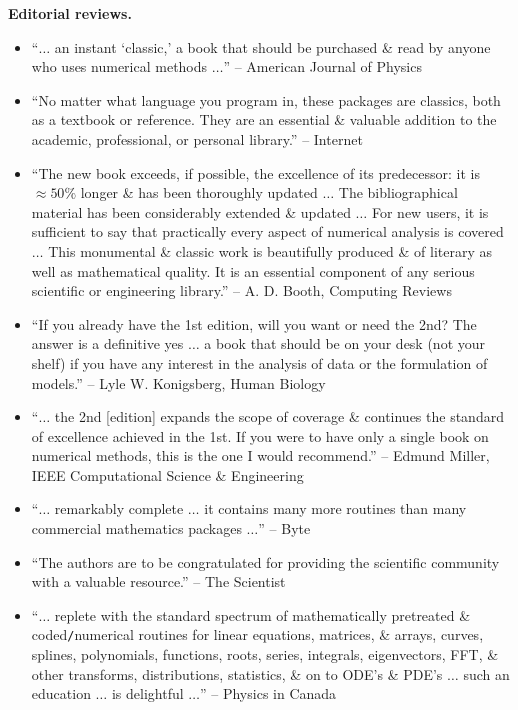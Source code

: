 \documentclass{article}
\begin{document}
\begin{enumerate}
	{\bf Editorial reviews.}
	\begin{itemize}
		\item ``$\ldots$ an instant `classic,' a book that should be purchased \& read by anyone who uses numerical methods $\ldots$'' -- American Journal of Physics
		\item ``No matter what language you program in, these packages are classics, both as a textbook or reference. They are an essential \& valuable addition to the academic, professional, or personal library.'' -- Internet
		\item ``The new book exceeds, if possible, the excellence of its predecessor: it is $\approx50\%$ longer \& has been thoroughly updated $\ldots$ The bibliographical material has been considerably extended \& updated $\ldots$ For new users, it is sufficient to say that practically every aspect of numerical analysis is covered $\ldots$ This monumental \& classic work is beautifully produced \& of literary as well as mathematical quality. It is an essential component of any serious scientific or engineering library.'' -- {\sc A. D. Booth}, Computing Reviews
		\item ``If you already have the 1st edition, will you want or need the 2nd? The answer is a definitive yes $\ldots$ a book that should be on your desk (not your shelf) if you have any interest in the analysis of data or the formulation of models.'' -- {\sc  Lyle W. Konigsberg}, Human Biology
		\item ``$\ldots$ the 2nd [edition] expands the scope of coverage \& continues the standard of excellence achieved in the 1st. If you were to have only a single book on numerical methods, this is the one I would recommend.'' -- {\sc Edmund Miller}, IEEE Computational Science \& Engineering
		\item ``$\ldots$ remarkably complete $\ldots$ it contains many more routines than many commercial mathematics packages $\ldots$'' -- Byte
		\item ``The authors are to be congratulated for providing the scientific community with a valuable resource.'' -- The Scientist
		\item ``$\ldots$ replete with the standard spectrum of mathematically pretreated \& coded{\tt/}numerical routines for linear equations, matrices, \& arrays, curves, splines, polynomials, functions, roots, series, integrals, eigenvectors, FFT, \& other transforms, distributions, statistics, \& on to ODE's \& PDE's $\ldots$ such an education $\ldots$ is delightful $\ldots$'' -- Physics in Canada
	\end{itemize}
	

\end{enumerate}
\end{document}
